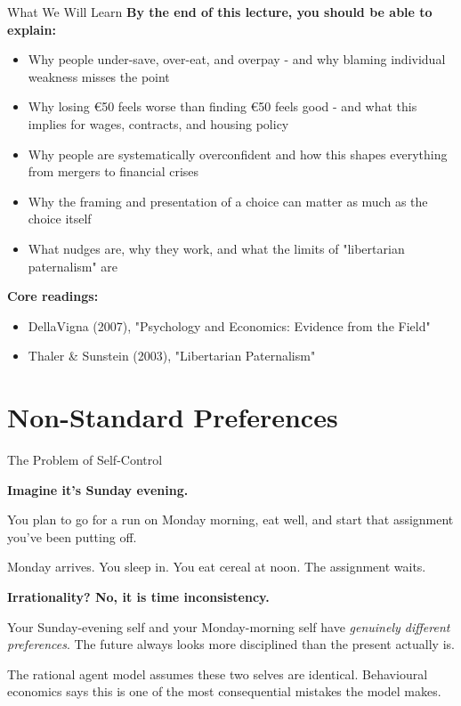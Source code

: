 \documentclass[10pt]{beamer}
\begin{document}
\begin{frame}{What We Will Learn}
\textbf{By the end of this lecture, you should be able to explain:}

\begin{itemize}
\item Why people \alert{under-save, over-eat, and overpay} - and why blaming individual weakness misses the point
\item Why \alert{losing \euro 50 feels worse than finding \euro 50 feels good} - and what this implies for wages, contracts, and housing policy
\item Why people are \alert{systematically overconfident} and how this shapes everything from mergers to financial crises
\item Why the \alert{framing and presentation of a choice} can matter as much as the choice itself
\item What \alert{nudges} are, why they work, and what the limits of "libertarian paternalism" are
\end{itemize}


\textbf{Core readings:}
\begin{itemize}
\item DellaVigna (2007), "Psychology and Economics: Evidence from the Field"
\item Thaler \& Sunstein (2003), "Libertarian Paternalism"
\end{itemize}
\end{frame}

\section{Non-Standard Preferences}

\begin{frame}{The Problem of Self-Control}

\textbf{Imagine it's Sunday evening.}


You plan to go for a run on Monday morning, eat well, and start that assignment you've been putting off.


Monday arrives. You sleep in. You eat cereal at noon. The assignment waits.


\textbf{Irrationality? No, it is \alert{time inconsistency}.}


Your Sunday-evening self and your Monday-morning self have \emph{genuinely different preferences}.
The future always looks more disciplined than the present actually is.


\alert{The rational agent model assumes these two selves are identical.}
Behavioural economics says this is one of the most consequential mistakes the model makes.
\end{frame}
\end{document}
